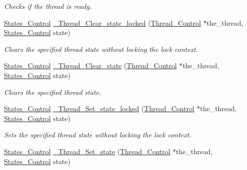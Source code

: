 \begin{DoxyCompactItemize}
\begin{DoxyCompactList}\small\item\em Checks if the thread is ready. \end{DoxyCompactList}\item 
\mbox{\hyperlink{group__RTEMSScoreStates_gaeebbea0bfca162709b124fd519cf99d3}{States\+\_\+\+Control}} \mbox{\hyperlink{group__RTEMSScoreThread_gae54a6095e8c9f868b54545fdbfc8f061}{\+\_\+\+Thread\+\_\+\+Clear\+\_\+state\+\_\+locked}} (\mbox{\hyperlink{struct__Thread__Control}{Thread\+\_\+\+Control}} $\ast$the\+\_\+thread, \mbox{\hyperlink{group__RTEMSScoreStates_gaeebbea0bfca162709b124fd519cf99d3}{States\+\_\+\+Control}} state)
\begin{DoxyCompactList}\small\item\em Clears the specified thread state without locking the lock context. \end{DoxyCompactList}\item 
\mbox{\hyperlink{group__RTEMSScoreStates_gaeebbea0bfca162709b124fd519cf99d3}{States\+\_\+\+Control}} \mbox{\hyperlink{group__RTEMSScoreThread_ga7e35e9ebb9a5364d00f1f1b1e166e701}{\+\_\+\+Thread\+\_\+\+Clear\+\_\+state}} (\mbox{\hyperlink{struct__Thread__Control}{Thread\+\_\+\+Control}} $\ast$the\+\_\+thread, \mbox{\hyperlink{group__RTEMSScoreStates_gaeebbea0bfca162709b124fd519cf99d3}{States\+\_\+\+Control}} state)
\begin{DoxyCompactList}\small\item\em Clears the specified thread state. \end{DoxyCompactList}\item 
\mbox{\hyperlink{group__RTEMSScoreStates_gaeebbea0bfca162709b124fd519cf99d3}{States\+\_\+\+Control}} \mbox{\hyperlink{group__RTEMSScoreThread_gad6439dfd95e92d9d3b2679d2b7c6891a}{\+\_\+\+Thread\+\_\+\+Set\+\_\+state\+\_\+locked}} (\mbox{\hyperlink{struct__Thread__Control}{Thread\+\_\+\+Control}} $\ast$the\+\_\+thread, \mbox{\hyperlink{group__RTEMSScoreStates_gaeebbea0bfca162709b124fd519cf99d3}{States\+\_\+\+Control}} state)
\begin{DoxyCompactList}\small\item\em Sets the specified thread state without locking the lock context. \end{DoxyCompactList}\item 
\mbox{\hyperlink{group__RTEMSScoreStates_gaeebbea0bfca162709b124fd519cf99d3}{States\+\_\+\+Control}} \mbox{\hyperlink{group__RTEMSScoreThread_ga630f8dade381bc0c0c70298a757acba8}{\+\_\+\+Thread\+\_\+\+Set\+\_\+state}} (\mbox{\hyperlink{struct__Thread__Control}{Thread\+\_\+\+Control}} $\ast$the\+\_\+thread, \mbox{\hyperlink{group__RTEMSScoreStates_gaeebbea0bfca162709b124fd519cf99d3}{States\+\_\+\+Control}} state)

\end{DoxyCompactItemize}
